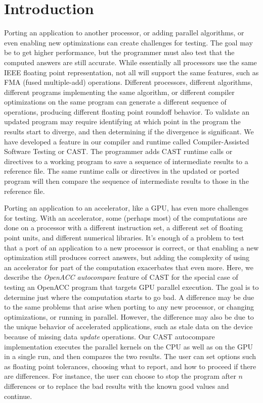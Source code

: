 \section{Introduction}

Porting an application to another processor, or adding parallel algorithms, or even enabling new optimizations can create challenges for testing.
The goal may be to get higher performance, but the programmer must also test that the computed answers are still accurate.
While essentially all processors use the same IEEE floating point representation, not all will support the same features, such as FMA (fused multiple-add) operations.
Different processors, different algorithms, different programs implementing the same algorithm, or different compiler optimizations on the same program can generate a different sequence of operations, producing different floating point roundoff behavior.
To validate an updated program may require identifying at which point in the program the results start to diverge, and then determining if the divergence is significant.
We have developed a feature in our compiler and runtime called Compiler-Assisted Software Testing or CAST\cite{ahmad.submitted.17}.
The programmer adds CAST runtime calls or directives to a working program to save a sequence of intermediate results to a reference file.
The same runtime calls or directives in the updated or ported program will then compare the sequence of intermediate results to those in the reference file.

Porting an application to an accelerator, like a GPU, has even more challenges for testing.
With an accelerator, some (perhaps most) of the computations are done on a processor with a different instruction set, a different set of floating point units, and different numerical libraries.
It's enough of a problem to test that a port of an application to a new processor is correct, or that enabling a new optimization still produces correct answers, but adding the complexity of using an accelerator for part of the computation exacerbates that even more.
Here, we describe the \emph{OpenACC autocompare} feature of CAST for the special case of testing an OpenACC\cite{openacc.16} program that targets GPU parallel execution.
The goal is to determine just where the computation starts to go bad.
A difference may be due to the same problems that arise when porting to any new processor, or changing optimizations, or running in parallel.
However, the difference may also be due to the unique behavior of accelerated applications, such as stale data on the device because of missing data \emph{update} operations.
Our CAST autocompare implementation executes the parallel kernels on the CPU as well as on the GPU in a single run, and then compares the two results.
The user can set options such as floating point tolerances, choosing what to report, and how to proceed if there are differences.
For instance, the user can choose to stop the program after $n$ differences or to replace the bad results with the known good values and continue.

